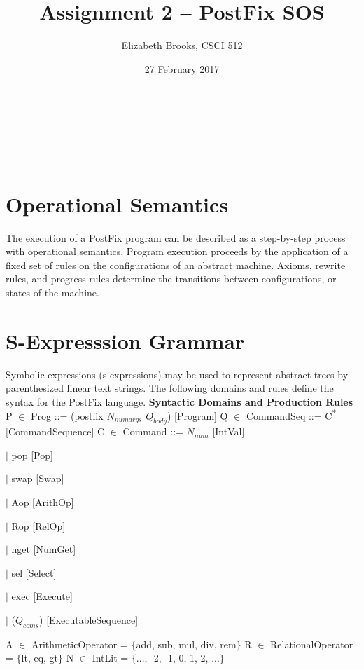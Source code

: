 \documentclass[a4paper,11pt]{article}
\makeatletter
\newcommand{\linia}{\rule{\linewidth}{0.5pt}}
\renewcommand{\maketitle}{
\begin{center}
\vspace{2ex}
{\huge \textsc{\@title}}
\vspace{1ex}
\\
\linia\\
\@author \hfill \@date
\vspace{2ex}
\end{center}
}
\makeatother
\begin{document}
\title{Assignment 2 -- PostFix SOS}
\author{Elizabeth Brooks, CSCI 512}
\date{27 February 2017}
\maketitle
\section{Operational Semantics}
\begin{par} The execution of a PostFix program can be described as a step-by-step process with operational semantics. Program execution proceeds by the application of a fixed set of rules on the configurations of an abstract machine. Axioms, rewrite rules, and progress rules determine the transitions between configurations, or states of the machine.\end{par}
\section{S-Expresssion Grammar}
\begin{par} Symbolic-expressions (s-expressions) may be used to represent abstract trees by parenthesized linear text strings. The following domains and rules define the syntax for the PostFix language.
\vspace{5mm} \newline
\textbf{Syntactic Domains and Production Rules} \newline
P $\in$ Prog ::= (postfix $N_{numargs}$ $Q_{body}$) \hfill [Program] \newline
Q $\in$ CommandSeq ::= C\textsuperscript{$\ast$} \hfill [CommandSequence] \newline
C $\in$ Command ::= $N_{num}$ \hfill [IntVal]
\begin{par} $\mid$ pop \hfill [Pop] \end{par}
\begin{par} $\mid$ swap \hfill [Swap] \end{par}
\begin{par} $\mid$ Aop \hfill [ArithOp] \end{par}
\begin{par} $\mid$ Rop \hfill [RelOp] \end{par}
\begin{par} $\mid$ nget \hfill [NumGet] \end{par}
\begin{par} $\mid$ sel \hfill [Select] \end{par}
\begin{par} $\mid$ exec \hfill [Execute] \end{par}
\begin{par} $\mid$ ($Q_{coms}$) \hfill [ExecutableSequence] \end{par} \newline
A $\in$ ArithmeticOperator = $\{$add, sub, mul, div, rem$\}$ \newline
R $\in$ RelationalOperator = $\{$lt, eq, gt$\}$ \newline
N $\in$ IntLit = $\{$..., -2, -1, 0, 1, 2, ...$\}$ \end{par}
\end{document}
